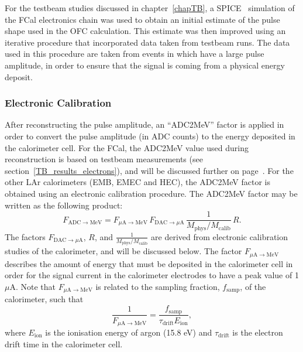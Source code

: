 For the testbeam studies discussed in chapter~\ref{chapTB}, a SPICE~\cite{SPICE_paper} simulation of the FCal electronics chain was used to obtain an initial estimate of the pulse shape used in the OFC calculation. This estimate was then improved using an iterative procedure that incorporated data taken from testbeam runs. The data used in this procedure are taken from events in which have a large pulse amplitude, in order to ensure that the signal is coming from a physical energy deposit. 




\subsubsection{Electronic Calibration}
\label{ECal}
After reconstructing the pulse amplitude, an ``ADC2MeV'' factor is applied in order to convert the pulse amplitude (in ADC counts) to the energy deposited in the calorimeter cell. For the FCal, the ADC2MeV value used during reconstruction is based on testbeam measurements (see section~\ref{TB_results_electrons}), and will be discussed further on page~\pageref{FCal_ecal_page}. For the other LAr calorimeters (EMB, EMEC and HEC), the ADC2MeV factor is obtained using an electronic calibration procedure. The ADC2MeV factor may be written as the following product:
\begin{equation}
F_{\mathrm{ADC}\rightarrow\mathrm{MeV}} = F_{\mu \mathrm{A}\rightarrow\mathrm{MeV}} \, F_{\mathrm{DAC}\rightarrow\mu\mathrm{A}} \, \frac{1}{M_\mathrm{phys}/M_\mathrm{calib}}  \, R.
\label{ECal_equation}
\end{equation}
The factors $F_{\mathrm{DAC}\rightarrow\mu\mathrm{A}}$, $R$, and $\frac{1}{M_\mathrm{phys}/M_\mathrm{calib}}$ are derived from electronic calibration studies of the calorimeter, and will be discussed below. The factor $F_{\mu\mathrm{A}\rightarrow\mathrm{MeV}}$ describes the amount of energy that must be deposited in the calorimeter cell in order for the signal current in the calorimeter electrodes to have a peak value of 1 $\mu$A. Note that $F_{\mu\mathrm{A}\rightarrow\mathrm{MeV}}$ is related to the sampling fraction, $f_\mathrm{samp}$, of the calorimeter, such that
\begin{equation}
\frac{1}{F_{\mu\mathrm{A}\rightarrow\mathrm{MeV}}} = \frac{f_\mathrm{samp}}{\tau_\mathrm{drift} E_\mathrm{ion}},
\end{equation}
where $E_\mathrm{ion}$ is the ionisation energy of argon (15.8 eV) and $\tau_\mathrm{drift}$ is the electron drift time in the calorimeter cell. 



